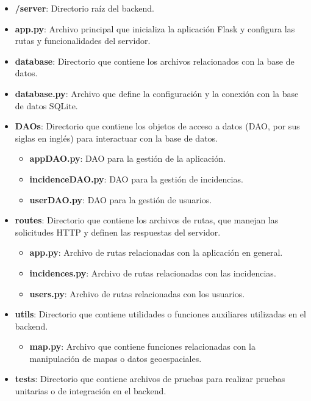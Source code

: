 \documentclass{article}
\begin{document}
\begin{itemize}
    \item \textbf{/server}: Directorio raíz del backend.
    \item \textbf{app.py}: Archivo principal que inicializa la aplicación Flask y configura las rutas y funcionalidades del servidor.
    \item \textbf{database}: Directorio que contiene los archivos relacionados con la base de datos.
    \item \textbf{database.py}: Archivo que define la configuración y la conexión con la base de datos SQLite.
    \item \textbf{DAOs}: Directorio que contiene los objetos de acceso a datos (DAO, por sus siglas en inglés) para interactuar con la base de datos.
    \begin{itemize}
        \item \textbf{appDAO.py}: DAO para la gestión de la aplicación.
        \item \textbf{incidenceDAO.py}: DAO para la gestión de incidencias.
        \item \textbf{userDAO.py}: DAO para la gestión de usuarios.
    \end{itemize}
    \item \textbf{routes}: Directorio que contiene los archivos de rutas, que manejan las solicitudes HTTP y definen las respuestas del servidor.
    \begin{itemize}
        \item \textbf{app.py}: Archivo de rutas relacionadas con la aplicación en general.
        \item \textbf{incidences.py}: Archivo de rutas relacionadas con las incidencias.
        \item \textbf{users.py}: Archivo de rutas relacionadas con los usuarios.
    \end{itemize}
    \item \textbf{utils}: Directorio que contiene utilidades o funciones auxiliares utilizadas en el backend.
    \begin{itemize}
        \item \textbf{map.py}: Archivo que contiene funciones relacionadas con la manipulación de mapas o datos geoespaciales. 
    \end{itemize}
    \item \textbf{tests}: Directorio que contiene archivos de pruebas para realizar pruebas unitarias o de integración en el backend.
\end{itemize}
\end{document}
